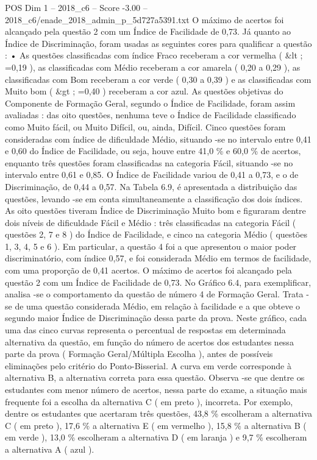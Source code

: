 \begin{textsample}{POS Dim 1 – 2018\_c6 – Score -3.00 – 2018\_c6/enade\_2018\_admin\_p\_5d727a5391.txt}
O máximo de acertos foi alcançado pela questão 2 com um Índice de Facilidade de 0,73.
Já quanto ao Índice de Discriminação, foram usadas as seguintes cores para qualificar a questão : • As questões classificadas com índice Fraco receberam a cor vermelha ( \&lt ; =0,19 ), as classificadas com Médio receberam a cor amarela ( 0,20 a 0,29 ), as classificadas com Bom receberam a cor verde ( 0,30 a 0,39 ) e as classificadas com Muito bom ( \&gt ; =0,40 ) receberam a cor azul.
As questões objetivas do Componente de Formação Geral, segundo o Índice de Facilidade, foram assim avaliadas : das oito questões, nenhuma teve o Índice de Facilidade classificado como Muito fácil, ou Muito Difícil, ou, ainda, Difícil.
Cinco questões foram consideradas com índice de dificuldade Médio, situando -se no intervalo entre 0,41 e 0,60 do Índice de Facilidade, ou seja, houve entre 41,0 \% e 60,0 \% de acertos, enquanto três questões foram classificadas na categoria Fácil, situando -se no intervalo entre 0,61 e 0,85.
O Índice de Facilidade variou de 0,41 a 0,73, e o de Discriminação, de 0,44 a 0,57.
Na Tabela 6.9, é apresentada a distribuição das questões, levando -se em conta simultaneamente a classificação dos dois índices.
As oito questões tiveram Índice de Discriminação Muito bom e figuraram dentre dois níveis de dificuldade Fácil e Médio : três classificadas na categoria Fácil ( questões 2, 7 e 8 ) do Índice de Facilidade, e cinco na categoria Médio ( questões 1, 3, 4, 5 e 6 ).
Em particular, a questão 4 foi a que apresentou o maior poder discriminatório, com índice 0,57, e foi considerada Médio em termos de facilidade, com uma proporção de 0,41 acertos.
O máximo de acertos foi alcançado pela questão 2 com um Índice de Facilidade de 0,73.
No Gráfico 6.4, para exemplificar, analisa -se o comportamento da questão de número 4 de Formação Geral.
Trata -se de uma questão considerada Médio, em relação à facilidade e a que obteve o segundo maior Índice de Discriminação dessa parte da prova.
Neste gráfico, cada uma das cinco curvas representa o percentual de respostas em determinada alternativa da questão, em função do número de acertos dos estudantes nessa parte da prova ( Formação Geral/Múltipla Escolha ), antes de possíveis eliminações pelo critério do Ponto-Bisserial.
A curva em verde corresponde à alternativa B, a alternativa correta para essa questão.
Observa -se que dentre os estudantes com menor número de acertos, nessa parte do exame, a situação mais frequente foi a escolha da alternativa C ( em preto ), incorreta.
Por exemplo, dentre os estudantes que acertaram três questões, 43,8 \% escolheram a alternativa C ( em preto ), 17,6 \% a alternativa E ( em vermelho ), 15,8 \% a alternativa B ( em verde ), 13,0 \% escolheram a alternativa D ( em laranja ) e 9,7 \% escolheram a alternativa A ( azul ).

\end{textsample}
